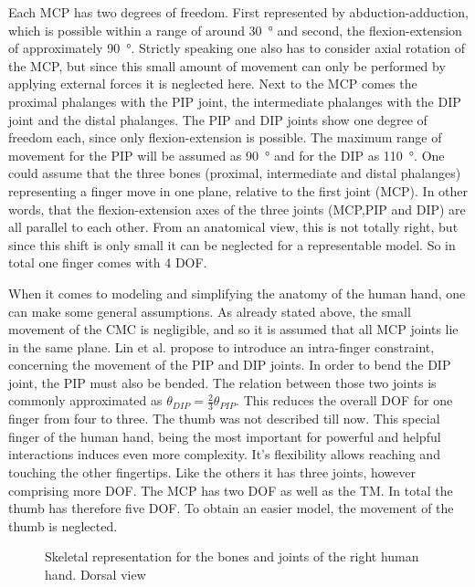 Each \ac{MCP} has two degrees of freedom. First represented by abduction-adduction, which is possible within a range of around \SI{30}{\degree} and second, the flexion-extension of approximately \SI{90}{\degree}. Strictly speaking one also has to consider axial rotation of the MCP, but since this small amount of movement can only be performed by applying external forces it is neglected here. Next to the MCP comes the proximal phalanges with the \ac{PIP} joint, the intermediate phalanges with the \ac{DIP} joint and the distal phalanges. The \ac{PIP} and \ac{DIP} joints show one degree of freedom each, since only flexion-extension is possible. The maximum range of movement for the \ac{PIP} will be assumed as \SI{90}{\degree} and for the \ac{DIP} as \SI{110}{\degree}. One could assume that the three bones (proximal, intermediate and distal phalanges) representing a finger move in one plane, relative to the first joint (\ac{MCP}). In other words, that the flexion-extension axes of the three joints (\ac{MCP},\ac{PIP} and \ac{DIP}) are all parallel to each other. From an anatomical view, this is not totally right, but since this shift is only small it can be neglected for a representable model. So in total one finger comes with 4 \ac{DOF}. 

When it comes to modeling and simplifying the anatomy of the human hand, one can make some general assumptions. As already stated above, the small movement of the \ac{CMC} is negligible, and so it is assumed that all \ac{MCP} joints lie in the same plane. Lin et al. propose to introduce an intra-finger constraint, concerning the movement of the \ac{PIP} and \ac{DIP} joints. In order to bend the \ac{DIP} joint, the \ac{PIP} must also be bended. The relation between those two joints is commonly approximated as $ \theta_{DIP} = \frac{2}{3} \theta_{PIP} $. This reduces the overall \ac{DOF} for one finger from four to three. The thumb was not described till now. This special finger of the human hand, being the most important for powerful and helpful interactions induces even more complexity. It's flexibility allows reaching and touching the other fingertips. Like the others it has three joints, however comprising more \ac{DOF}. The \ac{MCP} has two \ac{DOF} as well as the \ac{TM}. In total the thumb has therefore five \ac{DOF}. To obtain an easier model, the movement of the thumb is neglected.


\begin{figure}[h]
\centering
	\hfill
\caption{Skeletal representation for the bones and joints of the right human hand. Dorsal view \cite{bullock2012assessing}}
\label{fig:skeletHand}
\end{figure}

